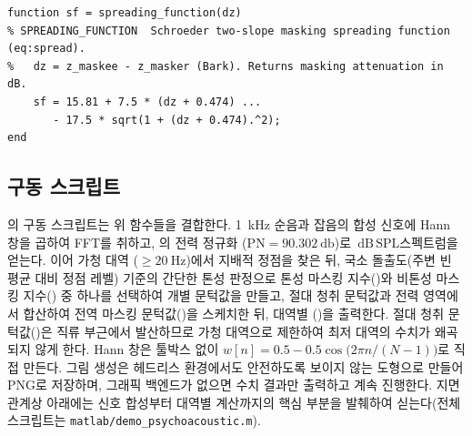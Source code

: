 \documentclass[11pt,a4paper]{article}
\newcommand{\dBSPL}{\ensuremath{\,\mathrm{dB\,SPL}}}  %
\newcommand{\SMR}{\mathrm{SMR}}                        %
\begin{document}
\begin{lstlisting}[caption={spreading\_function.m --- Schroeder two-slope spreading (eq:spread)},label={lst:spread}]
function sf = spreading_function(dz)
% SPREADING_FUNCTION  Schroeder two-slope masking spreading function (eq:spread).
%   dz = z_maskee - z_masker (Bark). Returns masking attenuation in dB.
    sf = 15.81 + 7.5 * (dz + 0.474) ...
       - 17.5 * sqrt(1 + (dz + 0.474).^2);
end
\end{lstlisting}

\subsection{구동 스크립트}
의 구동 스크립트는 위 함수들을 결합한다. \SI{1}{\kilo\hertz} 순음과
잡음의 합성 신호에 Hann 창을 곱하여 FFT를 취하고, 의 전력 정규화
($\mathrm{PN}=\SI{90.302}{\decibel}$)로 \dBSPL 스펙트럼을 얻는다. 이어 가청 대역
($\ge\SI{20}{\hertz}$)에서 지배적 정점을 찾은 뒤, 국소 돌출도(주변 빈 평균 대비 정점
레벨) 기준의 간단한 톤성 판정으로 톤성 마스킹 지수()와 비톤성 마스킹
지수() 중 하나를 선택하여 개별 문턱값을 만들고, 절대 청취 문턱값과
전력 영역에서 합산하여 전역 마스킹 문턱값()을 스케치한 뒤, 대역별
\SMR()을 출력한다. 절대 청취 문턱값()은 직류 부근에서
발산하므로 가청 대역으로 제한하여 최저 대역의 수치가 왜곡되지 않게 한다. Hann 창은 툴박스 없이
$w[n]=0.5-0.5\cos\bigl(2\pi n/(N-1)\bigr)$로 직접 만든다. 그림 생성은 헤드리스
환경에서도 안전하도록 보이지 않는 도형으로 만들어 PNG로 저장하며, 그래픽 백엔드가
없으면 수치 결과만 출력하고 계속 진행한다. 지면 관계상 아래에는 신호 합성부터 대역별
\SMR 계산까지의 핵심 부분을 발췌하여 싣는다(전체 스크립트는 \texttt{matlab/demo\_psychoacoustic.m}).
\end{document}
